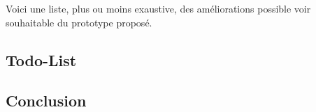 
Voici une liste, plus ou moins exaustive, des améliorations possible
voir souhaitable du prototype proposé.

\subsection{Todo-List}



\subsection{Conclusion}
